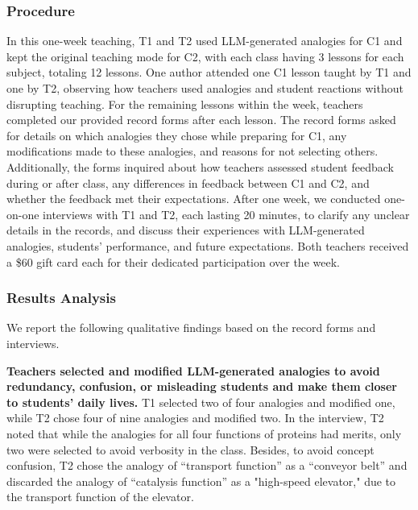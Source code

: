 \subsubsection{Procedure}
\label{sec:study22_procedure}
In this one-week teaching, T1 and T2 used LLM-generated analogies for C1 and kept the original teaching mode for C2, with each class having 3 lessons for each subject, totaling 12 lessons.
One author attended one C1 lesson taught by T1 and one by T2, observing how teachers used analogies and student reactions without disrupting teaching.
For the remaining lessons within the week, teachers completed our provided record forms after each lesson.
The record forms asked for details on which analogies they chose while preparing for C1, any modifications made to these analogies, and reasons for not selecting others. 
Additionally, the forms inquired about how teachers assessed student feedback during or after class, any differences in feedback between C1 and C2, and whether the feedback met their expectations.
After one week, we conducted one-on-one interviews with T1 and T2, each lasting 20 minutes, to clarify any unclear details in the records, and discuss their experiences with LLM-generated analogies, students' performance, and future expectations.
Both teachers received a \$60 gift card each for their dedicated participation over the week.

\subsubsection{Results Analysis}
\label{sec:study22_results_analysis}

We report the following qualitative findings based on the record forms and interviews.


\textbf{Teachers selected and modified LLM-generated analogies to avoid redundancy, confusion, or misleading students and make them closer to students' daily lives.}
T1 selected two of four analogies and modified one, while T2 chose four of nine analogies and modified two.
In the interview, T2 noted that while the analogies for all four functions of proteins had merits, only two were selected to avoid verbosity in the class. 
Besides, to avoid concept confusion, T2 chose the analogy of ``transport function'' as a ``conveyor belt'' and discarded the analogy of ``catalysis function'' as a "high-speed elevator," due to the transport function of the elevator.

